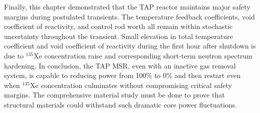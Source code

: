 Finally, this chapter demonstrated that the \gls{TAP} reactor maintains major 
safety margins during postulated transients. The temperature feedback 
coefficients, void coefficient of reactivity, and control rod worth all remain 
within stochastic uncertainty throughout the transient. Small elevation in 
total temperature coefficient and void coefficient of reactivity during the 
first hour after shutdown is due to $^{135}$Xe concentration raise and 
corresponding short-term neutron spectrum hardening. In conclusion, the 
\gls{TAP} \gls{MSR}, even with an inactive gas removal system, is capable to 
reducing power from 100\% to 0\% and then restart even when $^{135}$Xe 
concentration culminates without compromising critical safety margins. 
The comprehensive material study must be done to prove that structural 
materials could withstand such dramatic core power fluctuations.





